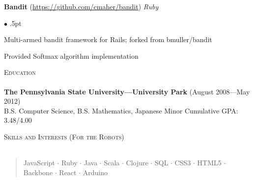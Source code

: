 \documentclass{article}
\newcommand{\skill}[1]{\begin{verse}#1\end{verse} }
\newcommand{\lineunder}{\vspace*{-8pt} \\ \hspace*{-18pt} \hrulefill \\}
\newcommand{\header}[1]{{\hspace*{-15pt}\vspace*{8pt} \textsc{#1}} \vspace*{-4pt} \lineunder}
\newcommand{\project}[3]{{ \textbf{#1} (\url{#2}) \hfill \textit{#3} \\ }}
\newenvironment{achievements}{\begin{list}{$\bullet$}{\topsep 0pt \itemsep .5pt}}{\vspace*{4pt}\end{list}}
\newcommand{\school}[4]{
 \textbf{#1} (#2) \\ #3 \hfill #4 \\
\vspace*{5pt}
}
\begin{document}
\project{Bandit}{https://github.com/cmaher/bandit}{Ruby}
    \begin{achievements}
    \item Multi-armed bandit framework for Rails; forked from bmuller/bandit
    \item Provided Softmax algorithm implementation
    \end{achievements}


\header{Education}
\school{The Pennsylvania State University---University Park}{August 2008---May 2012}{B.S. Computer Science, B.S. Mathematics, Japanese Minor}
{Cumulative GPA: 3.48/4.00}


\header{Skills and Interests (For the Robots)}
    \skill{JavaScript $\cdot$ Ruby $\cdot$ Java $\cdot$ Scala $\cdot$ Clojure
      $\cdot$ SQL $\cdot$ CSS3 $\cdot$ HTML5 $\cdot$ Backbone $\cdot$ React
      $\cdot$ Arduino }
\end{document}
